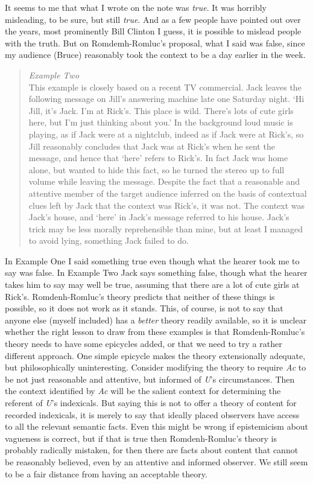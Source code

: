 It seems to me that what I wrote on the note was \textit{true}. It was horribly misleading, to be sure, but still \textit{true}. And as a few people have pointed out over the years, most prominently Bill Clinton I guess, it is possible to mislead people with the truth. But on Romdemh-Romluc's proposal, what I said was false, since my audience (Bruce) reasonably took the context to be a day earlier in the week.

\begin{quote}
{\itshape
Example Two} \\
This example is closely based on a recent TV commercial. Jack leaves the following message on Jill's answering machine late one Saturday night. `Hi Jill, it's Jack. I'm at Rick's. This place is wild. There's lots of cute girls here, but I'm just thinking about you.' In the background loud music is playing, as if Jack were at a nightclub, indeed as if Jack were at Rick's, so Jill reasonably concludes that Jack was at Rick's when he sent the message, and hence that `here' refers to Rick's. In fact Jack was home alone, but wanted to hide this fact, so he turned the stereo up to full volume while leaving the message. Despite the fact that a reasonable and attentive member of the target audience inferred on the basis of contextual clues left by Jack that the context was Rick's, it was not. The context was Jack's house, and `here' in Jack's message referred to his house. Jack's trick may be less morally reprehensible than mine, but at least I managed to avoid lying, something Jack failed to do.
\end{quote}

\noindent In Example One I said something true even though what the hearer took me to say was false. In Example Two Jack says something false, though what the hearer takes him to say may well be true, assuming that there are a lot of cute girls at Rick's. Romdenh-Romluc's theory predicts that neither of these things is possible, so it does not work as it stands. This, of course, is not to say that anyone else (myself included) has a \textit{better} theory readily available, so it is unclear whether the right lesson to draw from these examples is that Romdenh-Romluc's theory needs to have some epicycles added, or that we need to try a rather different approach. One simple epicycle makes the theory extensionally adequate, but philosophically uninteresting. Consider modifying the theory to require \textit{Ac} to be not just reasonable and attentive, but informed of \textit{U}'s circumstances. Then the context identified by \textit{Ac} will be the salient context for determining the referent of \textit{U}'s indexicals. But saying this is not to offer a theory of content for recorded indexicals, it is merely to say that ideally placed observers have access to all the relevant semantic facts. Even this might be wrong if epistemicism about vagueness is correct, but if that is true then Romdenh-Romluc's theory is probably radically mistaken, for then there are facts about content that cannot be reasonably believed, even by an attentive and informed observer. We still seem to be a fair distance from having an acceptable theory.


